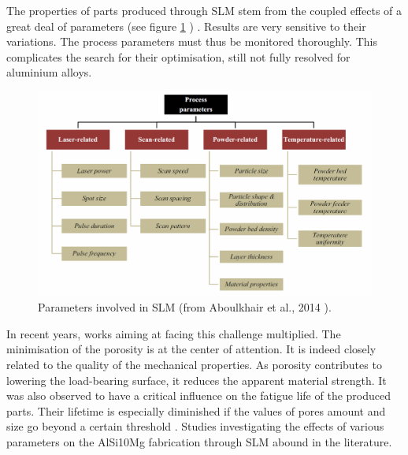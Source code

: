 The properties of parts produced through SLM stem from the coupled effects of a great deal of parameters (see figure \ref{fig:param} ) \parencite{Aboulkair140820}.  %
Results are very sensitive to their variations. The process parameters must thus be monitored thoroughly. This complicates the search for their optimisation, still not fully resolved for aluminium alloys.\\%
\begin{figure}[ht]
\centering
\includegraphics[scale=0.37]{Images/Param}
\decoRule

\caption[Parameters involved in SLM]{Parameters involved in SLM (from Aboulkhair et al., 2014 \parencite{Aboulkair140820}).}
\label{fig:param}
\end{figure}

In recent years, works aiming at facing this challenge multiplied. The minimisation of the porosity is at the center of attention. It is indeed closely related to the quality of the mechanical properties. As porosity contributes to lowering the load-bearing surface, it reduces the apparent material strength. It was also observed to have a critical influence on the fatigue life of the produced parts. Their lifetime is especially diminished if the values of pores amount and size go beyond a certain threshold \parencite{Brandl121509}. Studies investigating the effects of various parameters on the AlSi10Mg fabrication through SLM abound in the literature.\\

